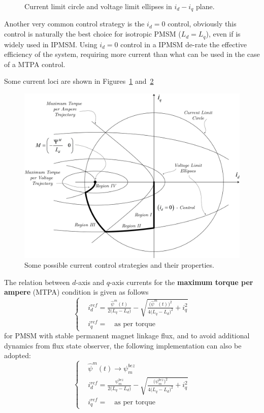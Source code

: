 \documentclass[11pt,a4paper]{article}
\numberwithin{equation}{section}
\theoremstyle{it}
\theoremstyle{definition}
\begin{document}
\begin{onehalfspace}
\begin{figure}[H]
	\captionsetup{width=0.5\textwidth, font=small}
	\caption{Current limit circle and voltage limit ellipses in $i_d-i_q$ plane.}
	\label{deflux_1}
\end{figure}
Another very common control strategy is the $i_d=0$ control, obviously this control is naturally the best choice for isotropic PMSM ($L_d=L_q$), even if is widely used in IPMSM. Using $i_d=0$ control in a IPMSM de-rate the effective efficiency of the system, requiring more current than what can be used in the case of a MTPA control.

Some current loci are shown in Figures~\ref{deflux_1} and~\ref{deflux_2}
\begin{figure}[H]
	\centering
	\includegraphics[width = 400pt, keepaspectratio]{figures/deflux/deflux_bianchi_9.jpg}
	\captionsetup{width=0.5\textwidth, font=small}
	\caption{Some possible current control strategies and their properties.}
	\label{deflux_2}
\end{figure}
The relation between $d$-axis and $q$-axis currents for the \textbf{maximum torque per ampere} (MTPA) condition is given as follows
\begin{equation}
	\left\lbrace \begin{aligned}
	&i_d^{ref} = \frac{\hat{\psi}^m(t)}{2\Big(L_q-L_d\Big)}-\sqrt{\frac{\Big(\hat{\psi}^m(t)\Big)^2}{4\Big(L_q-L_d\Big)^2}+i_q^2} \\[6pt]
	&i_q^{ref} = \quad\text{as per torque}
		\end{aligned}\right. 
\end{equation}
for PMSM with stable permanent magnet linkage flux, and to avoid additional dynamics from flux state observer, the following implementation can also be adopted:
\begin{equation}
	\left\lbrace \begin{aligned}
		&\hat{\psi}^m(t) \rightarrow \psi_m^{bez} \\[6pt]
		&i_d^{ref} = \frac{\psi_m^{bez}}{2\Big(L_q-L_d\Big)}-\sqrt{\frac{\Big(\psi_m^{bez}\Big)^2}{4\Big(L_q-L_d\Big)^2}+i_q^2} \\[6pt]
		&i_q^{ref} = \quad\text{as per torque}
	\end{aligned}\right. 
\end{equation}


\end{onehalfspace}
\end{document}
